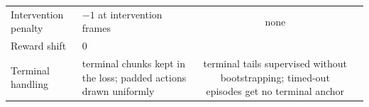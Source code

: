 \begin{tabular}{KVSV}
    Intervention penalty       & $-1$ at intervention frames                                                           & none                                                                                                                                                                                                                                                                              \\
    Reward shift               &                                                                                                                                                                                                                                                                                                                                                    \\
    Terminal handling          & terminal chunks kept in the loss; padded actions drawn uniformly                      & terminal tails supervised without bootstrapping; timed-out episodes get no terminal anchor                                                                                                                                                                                        \\
    \hline
  \end{tabular}
